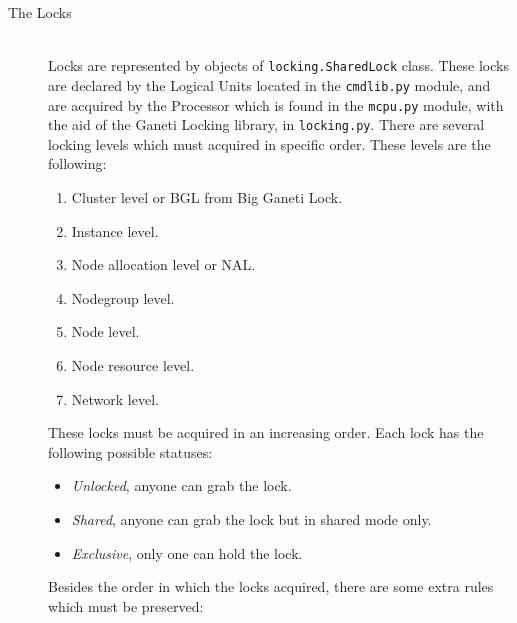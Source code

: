 \begin{description}
  \item[The Locks] \hfill \\
    Locks are represented by objects of \texttt{locking.SharedLock} class. These
    locks are declared by the Logical Units located in the \texttt{cmdlib.py}
    module, and are acquired by the Processor which is found in the
    \texttt{mcpu.py} module, with the aid of the Ganeti Locking library, in
    \texttt{locking.py}. There are several locking levels which must acquired in
    specific order. These levels are the following:

    \begin{enumerate}
      \item Cluster level or BGL from Big Ganeti Lock.
      \item Instance level.
      \item Node allocation level or NAL.
      \item Nodegroup level.
      \item Node level.
      \item Node resource level.
      \item Network level.
    \end{enumerate}

    These locks must be acquired in an increasing order. Each lock has the
    following possible statuses:

    \begin{itemize}
      \item \emph{Unlocked}, anyone can grab the lock.
      \item \emph{Shared}, anyone can grab the lock but in shared mode only.
      \item \emph{Exclusive}, only one can hold the lock.
    \end{itemize}

    Besides the order in which the locks acquired, there are some extra rules
    which must be preserved:


\end{description}

